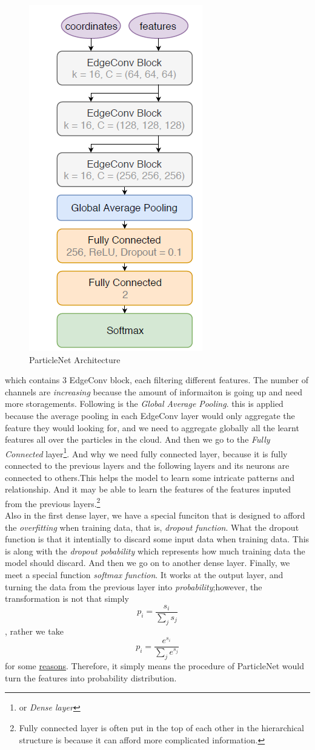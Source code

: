 \documentclass[12pt]{article}
\numberwithin{equation}{section}
\begin{document}
\begin{figure}[H]
    \centering
    \includegraphics[width=0.35\linewidth]{ParticleNet.png}
    \caption{ParticleNet Architecture}
    \label{3}
\end{figure}

which contains 3 EdgeConv block, each filtering different features. The number of channels are \textit{increasing} because the amount of informaiton is going up and need more storagements. Following is the \textit{Global Average Pooling}. this is applied because the average pooling in each EdgeConv layer would only aggregate the feature they would looking for, and we need to aggregate globally all the learnt features all over the particles in the cloud. And then we go to the \textit{Fully Connected} layer\footnote{or \textit{Dense layer}}. And why we need fully connected layer, because it is fully connected to the previous layers and the following layers and its neurons are connected to others.This helps the model to learn some intricate patterns and relationship. And it may be able to learn the features of the features inputed from the previous layers.\footnote{Fully connected layer is often put in the top of each other in the hierarchical structure is because it can afford more complicated information.}
\\
\indent Also in the first dense layer, we have a special funciton that is designed to afford the \textit{overfitting} when training data, that is, \textit{dropout function}. What the dropout function is that it intentially to discard some input data when training data. This is along with the \textit{dropout pobability} which represents how much training data the model should discard. And then we go on to another dense layer. Finally, we meet a special function \textit{softmax function}.
It works at the output layer, and turning the data from the previous layer into \textit{probability};however, the transformation is not that simply \[p_i = \frac{s_i}{\sum_{j}s_j}\], rather we take \[p_i = \frac{e^{s_i}}{\sum_{j}e^{s_j}}\] for some \href{https://www.youtube.com/watch?v=8ps_JEW42xs}{reasons}. Therefore, it simply means the procedure of ParticleNet would turn the features into probability distribution.
\end{document}
